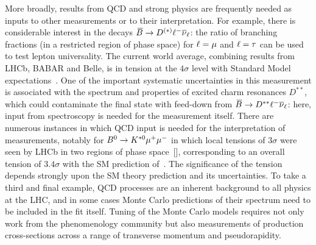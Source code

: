 More broadly, results from QCD and strong physics are frequently
needed as inputs to other measurements or to their interpretation.
For example, there is considerable interest in the decays
${\kern 0.18em\overline{\kern -0.18em B}{}} \rightarrow D^{(*)} {\ell}^- {{\overline{\nu}}_\ell}$: the ratio of branching fractions
(in a restricted region of phase space) for ${\ell}={\mu}$ and ${\ell}={\tau}$
can be used to test lepton universality. The current world average,
combining results from LHCb, BABAR and Belle, is in tension
at the $4\sigma$ level with Standard Model expectations~\cite{bib:hfag}.
One of the important systematic uncertainties in this measurement
is associated with the spectrum and properties of excited charm resonances $D^{**}$,
which could contaminate the final state with feed-down from
${\kern 0.18em\overline{\kern -0.18em B}{}} \rightarrow D^{**} {\ell}^- {{\overline{\nu}}_\ell}$: here, input from spectroscopy is
needed for the measurement itself. There are numerous instances
in which QCD input is needed for the interpretation of measurements,
notably for ${{B}^0} \rightarrow {\ensuremath{{K}^{*0}}} {\ensuremath{\mu^+}} {\ensuremath{\mu^-}}$ in which local tensions of
$3\sigma$ were seen by LHCb in two regions of phase space~[\cite{Aaij:2015oid}],
corresponding to an overall tension of $3.4\sigma$ with the SM
prediction of~\cite{Descotes-Genon:2014uoa}. The significance of the
tension depends strongly upon the SM theory prediction and its
uncertainties. To take a third and final example, QCD processes are
an inherent background to all physics at the LHC, and in some cases
Monte Carlo predictions of their spectrum need to be included in the
fit itself. Tuning of the Monte Carlo models requires not only work
from the phenomenology community but also measurements of production
cross-sections across a range of transverse momentum and
pseudorapidity.



